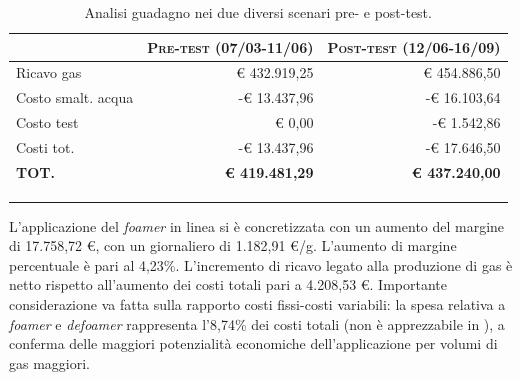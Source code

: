 \begin{table}[htbp]
\centering
\footnotesize
\caption{Analisi guadagno nei due diversi scenari pre- e post-test.}
\label{tab:guadagno}
\begin{tabular}{lrr}
\cline{2-3}
\multicolumn{1}{l|}{}                    & \multicolumn{1}{l|}{\textsc{Pre-test (07/03-11/06)}}              & \multicolumn{1}{l|}{\textsc{Post-test (12/06-16/09)}}             \\ \hline
\multicolumn{1}{|l|}{Ricavo gas}         & \multicolumn{1}{r|}{€ 432.919,25}                        & \multicolumn{1}{r|}{€ 454.886,50}                        \\
\multicolumn{1}{|l|}{Costo smalt. acqua} & \multicolumn{1}{r|}{{\color[HTML]{CB0000} -€ 13.437,96}} & \multicolumn{1}{r|}{{\color[HTML]{CB0000} -€ 16.103,64}} \\
\multicolumn{1}{|l|}{Costo test}         & \multicolumn{1}{r|}{€ 0,00}                              & \multicolumn{1}{r|}{-€ 1.542,86}                         \\
\multicolumn{1}{|l|}{Costi tot.}         & \multicolumn{1}{r|}{{\color[HTML]{CB0000} -€ 13.437,96}} & \multicolumn{1}{r|}{{\color[HTML]{CB0000} -€ 17.646,50}} \\
\multicolumn{1}{|l|}{\textbf{TOT.}}      & \multicolumn{1}{r|}{\textbf{€ 419.481,29}}               & \multicolumn{1}{r|}{\textbf{€ 437.240,00}}               \\ \hline
\textbf{}                                & \multicolumn{1}{l}{}                                     & \multicolumn{1}{l}{}                                     \\
\textbf{}                                & \multicolumn{1}{l}{\textbf{}}                            & \multicolumn{1}{l}{}                                     \\
\textbf{}                                & \multicolumn{1}{l}{\textbf{}}                            & \multicolumn{1}{l}{}                                    
\end{tabular}
\end{table}
L'applicazione del \textit{foamer} in linea si è concretizzata con un aumento del margine di 17.758,72 €, con un giornaliero di 1.182,91 €/g. L'aumento di margine percentuale è pari al 4,23\%. L'incremento di ricavo legato alla produzione di gas è netto rispetto all'aumento dei costi totali pari a 4.208,53 €. Importante considerazione va fatta sulla rapporto costi fissi-costi variabili: la spesa relativa a \textit{foamer} e \textit{defoamer} rappresenta l'8,74\% dei costi totali (non è apprezzabile in ), a conferma delle maggiori potenzialità economiche dell'applicazione per volumi di gas maggiori.\\

